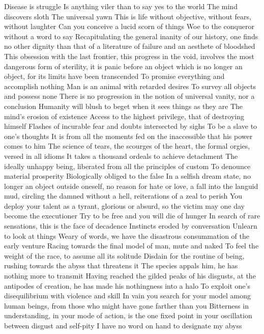 \documentclass{article}
\begin{document}
Disease is struggle
Is anything viler than to say yes to the world
The mind discovers sloth
The universal yawn
This is life without objective, without fears, without laughter
Can you conceive a lucid scorn of things
Woe to the conqueror without a word to say
Recapitulating the general inanity of our history, one finds no other dignity than that of a literature of failure and an aesthete of bloodshed
This obsession with the last frontier, this progress in the void, involves the most dangerous form of sterility, it is panic before an object which is no longer an object, for its limits have been transcended
To promise everything and accomplish nothing
Man is an animal with retarded desires
To survey all objects and possess none
There is no progression in the notion of universal vanity, nor a conclusion
Humanity will blush to beget when it sees things as they are
The mind's erosion of existence
Access to the highest privilege, that of destroying himself
Flashes of incurable fear and doubts intersected by sighs
To be a slave to one's thoughts
It is from all the moments fed on the inaccessible that his power comes to him
The science of tears, the scourges of the heart, the formal orgies, versed in all idioms
It takes a thousand ordeals to achieve detachment
The ideally unhappy being, liberated from all the principles of custom
To denounce material prosperity
Biologically obliged to the false
In a selfish dream state, no longer an object outside oneself, no reason for hate or love, a fall into the languid mud, circling the damned without a hell, reiterations of a zeal to perish
You deploy your talent as a tyrant, glorious or absurd, so the victim may one day become the executioner
Try to be free and you will die of hunger
In search of rare sensations, this is the face of decadence
Instincts eroded by conversation
Unlearn to look at things
Weary of words, we have the disastrous consummation of the early venture
Racing towards the final model of man, mute and naked
To feel the weight of the race, to assume all its solitude
Disdain for the routine of being, rushing towards the abyss that threatens it
The species appals him, he has nothing more to transmit
Having reached the gilded peaks of his disgusts, at the antipodes of creation, he has made his nothingness into a halo
To exploit one's disequilibrium with violence and skill
In vain you search for your model among human beings, from those who might have gone farther than you
Bitterness in understanding, in your mode of action, is the one fixed point in your oscillation between disgust and self-pity
I have no word on hand to designate my abyss
\end{document}
